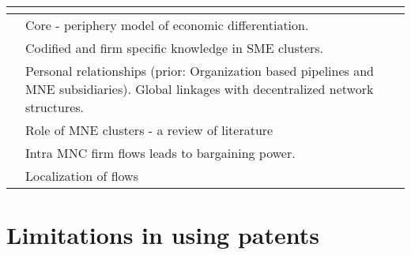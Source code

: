 \documentclass[12pt]{article}
\begin{document}
\begin{center}
\begin{longtable}{|p{}|p{}|p{}|}
\cite{Jaffe1993}&&\\\hline

\cite{Krugman1991a} & Core - periphery model of economic differentiation.&\\\hline

\cite{Lissoni2001} & Codified and firm specific knowledge in SME clusters.&\\\hline

\cite{Lorenzen2013} & Personal relationships (prior: Organization based pipelines and MNE subsidiaries). Global linkages with decentralized network structures.&\\\hline

\cite{Mudambi2012} & Role of MNE clusters - a review of literature&\\\hline

\cite{Mudambi2004} & Intra MNC firm flows leads to bargaining power.&\\\hline

\cite{Murata2014} & Localization of flows&\\\hline
\end{longtable}
\end{center}

\section{Limitations in using patents}
\cite{Griliches1990}
\cite{Scherer1984}
 

\end{document}
